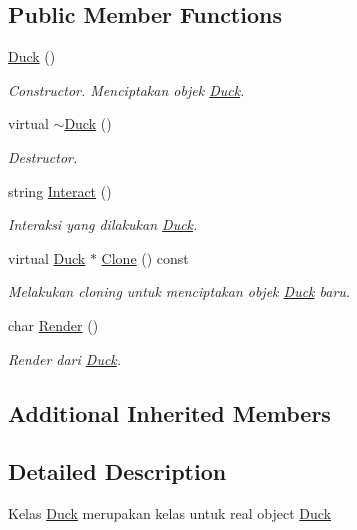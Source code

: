 \subsection*{Public Member Functions}
\begin{DoxyCompactItemize}
\item 
\hyperlink{classDuck_a65753b7b6eb80c4639f6bf165b8db9a6}{Duck} ()
\begin{DoxyCompactList}\small\item\em Constructor. Menciptakan objek \hyperlink{classDuck}{Duck}. \end{DoxyCompactList}\item 
virtual \hyperlink{classDuck_a073eb979ff45a938fde4cf769f5e579b}{$\sim$\+Duck} ()
\begin{DoxyCompactList}\small\item\em Destructor. \end{DoxyCompactList}\item 
string \hyperlink{classDuck_a9355aa821755703c02ac96e49692eaea}{Interact} ()
\begin{DoxyCompactList}\small\item\em Interaksi yang dilakukan \hyperlink{classDuck}{Duck}. \end{DoxyCompactList}\item 
virtual \hyperlink{classDuck}{Duck} $\ast$ \hyperlink{classDuck_ae3ff98b443c887f37ce63e3ed2e3a690}{Clone} () const 
\begin{DoxyCompactList}\small\item\em Melakukan cloning untuk menciptakan objek \hyperlink{classDuck}{Duck} baru. \end{DoxyCompactList}\item 
char \hyperlink{classDuck_a8453f95adcf2e7ff1b35a1a9d9948510}{Render} ()
\begin{DoxyCompactList}\small\item\em Render dari \hyperlink{classDuck}{Duck}. \end{DoxyCompactList}\end{DoxyCompactItemize}
\subsection*{Additional Inherited Members}


\subsection{Detailed Description}
Kelas \hyperlink{classDuck}{Duck} merupakan kelas untuk real object \hyperlink{classDuck}{Duck} 

